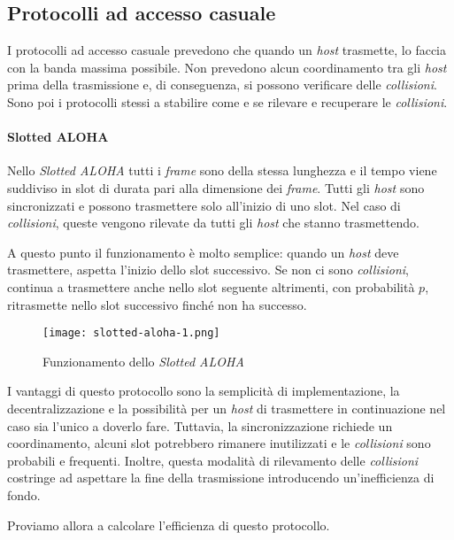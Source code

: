 \subsection{Protocolli ad accesso casuale}
I protocolli ad accesso casuale prevedono che quando un \emph{host} trasmette,
lo faccia con la banda massima possibile. Non prevedono alcun coordinamento tra
gli \emph{host} prima della trasmissione e, di conseguenza, si possono verificare
delle \emph{collisioni}. Sono poi i protocolli stessi a stabilire come e se
rilevare e recuperare le \emph{collisioni}.

\paragraph{Slotted ALOHA}
Nello \emph{Slotted ALOHA} tutti i \emph{frame} sono della stessa lunghezza e il
tempo viene suddiviso in slot di durata pari alla dimensione dei \emph{frame}.
Tutti gli \emph{host} sono sincronizzati e possono trasmettere solo all'inizio
di uno slot. Nel caso di \emph{collisioni}, queste vengono rilevate da tutti
gli \emph{host} che stanno trasmettendo.

A questo punto il funzionamento è molto semplice: quando un \emph{host} deve
trasmettere, aspetta l'inizio dello slot successivo. Se non ci sono
\emph{collisioni}, continua a trasmettere anche nello slot seguente altrimenti,
con probabilità $p$, ritrasmette nello slot successivo finché non ha successo.

\begin{figure}[h!]
    \centering
    \texttt{[image: slotted-aloha-1.png]}
    \caption{Funzionamento dello \emph{Slotted ALOHA}}
\end{figure}

\noindent
I vantaggi di questo protocollo sono la semplicità di implementazione, la
decentralizzazione e la possibilità per un \emph{host} di trasmettere in
continuazione nel caso sia l'unico a doverlo fare. Tuttavia, la sincronizzazione
richiede un coordinamento, alcuni slot potrebbero rimanere inutilizzati e le
\emph{collisioni} sono probabili e frequenti. Inoltre, questa modalità di
rilevamento delle \emph{collisioni} costringe ad aspettare la fine della
trasmissione introducendo un'inefficienza di fondo.

\bigskip\noindent
Proviamo allora a calcolare l'efficienza di questo protocollo.

